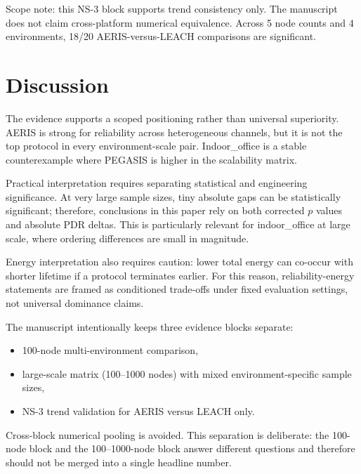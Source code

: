 ﻿\documentclass[sensors,article,submit,moreauthors,pdftex]{Definitions/mdpi}
\begin{document}
Scope note: this NS-3 block supports trend consistency only. The manuscript does not claim cross-platform numerical equivalence. Across 5 node counts and 4 environments, 18/20 AERIS-versus-LEACH comparisons are significant.

\section{Discussion}
The evidence supports a scoped positioning rather than universal superiority. AERIS is strong for reliability across heterogeneous channels, but it is not the top protocol in every environment-scale pair. Indoor\_office is a stable counterexample where PEGASIS is higher in the scalability matrix.

Practical interpretation requires separating statistical and engineering significance. At very large sample sizes, tiny absolute gaps can be statistically significant; therefore, conclusions in this paper rely on both corrected $p$ values and absolute PDR deltas. This is particularly relevant for indoor\_office at large scale, where ordering differences are small in magnitude.

Energy interpretation also requires caution: lower total energy can co-occur with shorter lifetime if a protocol terminates earlier. For this reason, reliability-energy statements are framed as conditioned trade-offs under fixed evaluation settings, not universal dominance claims.

The manuscript intentionally keeps three evidence blocks separate:
\begin{itemize}
\item 100-node multi-environment comparison,
\item large-scale matrix (100--1000 nodes) with mixed environment-specific sample sizes,
\item NS-3 trend validation for AERIS versus LEACH only.
\end{itemize}
Cross-block numerical pooling is avoided.
This separation is deliberate: the 100-node block and the 100--1000-node block answer different questions and therefore should not be merged into a single headline number.
\end{document}
